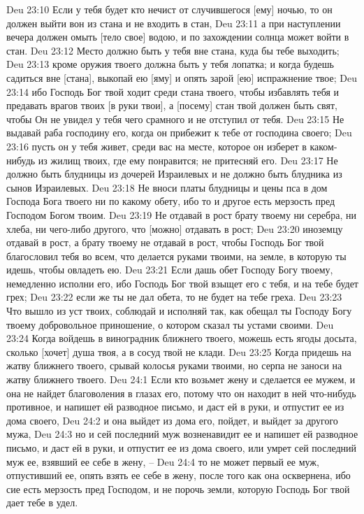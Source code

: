 Deu 23:10  Если у тебя будет кто нечист от случившегося [ему] ночью, то он должен выйти вон из стана и не входить в стан,
Deu 23:11  а при наступлении вечера должен омыть [тело свое] водою, и по захождении солнца может войти в стан.
Deu 23:12  Место должно быть у тебя вне стана, куда бы тебе выходить;
Deu 23:13  кроме оружия твоего должна быть у тебя лопатка; и когда будешь садиться вне [стана], выкопай ею [яму] и опять зарой [ею] испражнение твое;
Deu 23:14  ибо Господь Бог твой ходит среди стана твоего, чтобы избавлять тебя и предавать врагов твоих [в руки твои], а [посему] стан твой должен быть свят, чтобы Он не увидел у тебя чего срамного и не отступил от тебя.
Deu 23:15  Не выдавай раба господину его, когда он прибежит к тебе от господина своего;
Deu 23:16  пусть он у тебя живет, среди вас на месте, которое он изберет в каком-нибудь из жилищ твоих, где ему понравится; не притесняй его.
Deu 23:17  Не должно быть блудницы из дочерей Израилевых и не должно быть блудника из сынов Израилевых.
Deu 23:18  Не вноси платы блудницы и цены пса в дом Господа Бога твоего ни по какому обету, ибо то и другое есть мерзость пред Господом Богом твоим.
Deu 23:19  Не отдавай в рост брату твоему ни серебра, ни хлеба, ни чего-либо другого, что [можно] отдавать в рост;
Deu 23:20  иноземцу отдавай в рост, а брату твоему не отдавай в рост, чтобы Господь Бог твой благословил тебя во всем, что делается руками твоими, на земле, в которую ты идешь, чтобы овладеть ею.
Deu 23:21  Если дашь обет Господу Богу твоему, немедленно исполни его, ибо Господь Бог твой взыщет его с тебя, и на тебе будет грех;
Deu 23:22  если же ты не дал обета, то не будет на тебе греха.
Deu 23:23  Что вышло из уст твоих, соблюдай и исполняй так, как обещал ты Господу Богу твоему добровольное приношение, о котором сказал ты устами своими.
Deu 23:24  Когда войдешь в виноградник ближнего твоего, можешь есть ягоды досыта, сколько [хочет] душа твоя, а в сосуд твой не клади.
Deu 23:25  Когда придешь на жатву ближнего твоего, срывай колосья руками твоими, но серпа не заноси на жатву ближнего твоего.
Deu 24:1  Если кто возьмет жену и сделается ее мужем, и она не найдет благоволения в глазах его, потому что он находит в ней что-нибудь противное, и напишет ей разводное письмо, и даст ей в руки, и отпустит ее из дома своего,
Deu 24:2  и она выйдет из дома его, пойдет, и выйдет за другого мужа,
Deu 24:3  но и сей последний муж возненавидит ее и напишет ей разводное письмо, и даст ей в руки, и отпустит ее из дома своего, или умрет сей последний муж ее, взявший ее себе в жену, --
Deu 24:4  то не может первый ее муж, отпустивший ее, опять взять ее себе в жену, после того как она осквернена, ибо сие есть мерзость пред Господом, и не порочь земли, которую Господь Бог твой дает тебе в удел.
